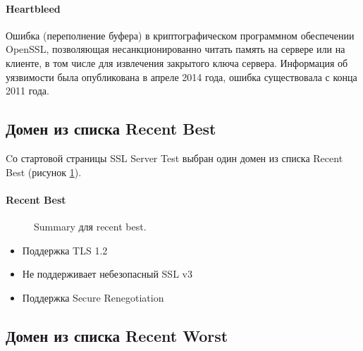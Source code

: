 \documentclass[10pt,a4paper]{report}
\begin{document}
\paragraph {Heartbleed\\}
Ошибка (переполнение буфера) в криптографическом программном обеспечении OpenSSL, позволяющая несанкционированно читать память на сервере или на клиенте, в том числе для извлечения закрытого ключа сервера. Информация об уязвимости была опубликована в апреле 2014 года, ошибка существовала с конца 2011 года.

\subsection{Домен из списка Recent Best}

Cо стартовой страницы SSL Server Test выбран один домен из списка Recent Best (рисунок \ref{Img:1}).

\paragraph {Recent Best\\}

\begin{figure}[h!]	
	\caption{Summary для recent best.}
	\label{Img:1}
\end{figure}

\begin{itemize}
	\item Поддержка TLS 1.2
	\item Не поддерживает небезопасный SSL v3
	\item Поддержка Secure Renegotiation
\end{itemize}

\subsection{Домен из списка Recent Worst}
\end{document}
